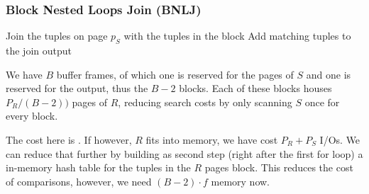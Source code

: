 \subsubsection{Block Nested Loops Join (BNLJ)}
\begin{algorithm}
    \caption{Block Nested Loops Join Algorithm}
    \begin{algorithmic}[1]
                    \State Join the tuples on page $p_S$ with the tuples in the block
                    \State Add matching tuples to the join output
                \EndFor
            \EndFor
        \EndProcedure
    \end{algorithmic}
\end{algorithm}

We have $B$ buffer frames, of which one is reserved for the pages of $S$ and one is reserved for the output, thus the $B - 2$ blocks.
Each of these blocks houses $P_R / (B - 2))$ pages of $R$, reducing search costs by only scanning $S$ once for every block.

The cost here is .
If however, $R$ fits into memory, we have cost $P_R + P_S$ I/Os.
We can reduce that further by building as second step (right after the first for loop) a in-memory hash table for the tuples in the $R$ pages block.
This reduces the cost of comparisons, however, we need $(B - 2) \cdot f$ memory now.
